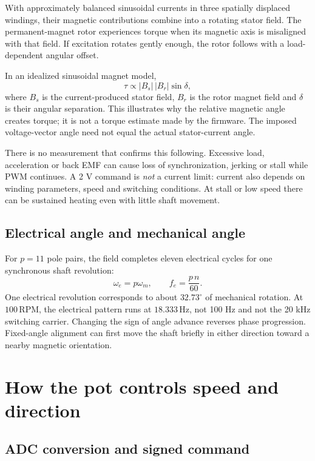 \documentclass[11pt,letterpaper]{article}
\newcommand{\rpm}{\mathrm{RPM}}
\begin{document}
With approximately balanced sinusoidal currents in three spatially displaced
windings, their magnetic contributions combine into a rotating stator field.
The permanent-magnet rotor experiences torque when its magnetic axis is
misaligned with that field. If excitation rotates gently enough, the rotor
follows with a load-dependent angular offset.\cite{stphysics}

In an idealized sinusoidal magnet model,
\begin{equation}
  \tau \propto |B_s|\,|B_r|\sin\delta,
\end{equation}
where $B_s$ is the current-produced stator field, $B_r$ is the rotor magnet
field and $\delta$ is their angular separation. This illustrates why the
relative magnetic angle creates torque; it is not a torque estimate made by
the firmware. The imposed voltage-vector angle need not equal the actual
stator-current angle.

There is no measurement that confirms this following. Excessive load,
acceleration or back EMF can cause loss of synchronization, jerking or stall
while PWM continues. A 2 V command is \emph{not} a current limit: current also
depends on winding parameters, speed and switching conditions. At stall or
low speed there can be sustained heating even with little shaft movement.

\subsection{Electrical angle and mechanical angle}

For $p=11$ pole pairs, the field completes eleven electrical cycles for one
synchronous shaft revolution:
\begin{equation}
  \omega_e=p\omega_m,\qquad f_e=\frac{p\,n}{60}.
  \label{eq:electrical}
\end{equation}
One electrical revolution corresponds to about $32.73^\circ$ of mechanical
rotation. At $100\,\rpm$, the electrical pattern runs at $18.333\,\mathrm{Hz}$,
not 100 Hz and not the 20 kHz switching carrier. Changing the sign of angle
advance reverses phase progression. Fixed-angle alignment can first move the
shaft briefly in either direction toward a nearby magnetic orientation.

\section{How the pot controls speed and direction}

\subsection{ADC conversion and signed command}
\end{document}
